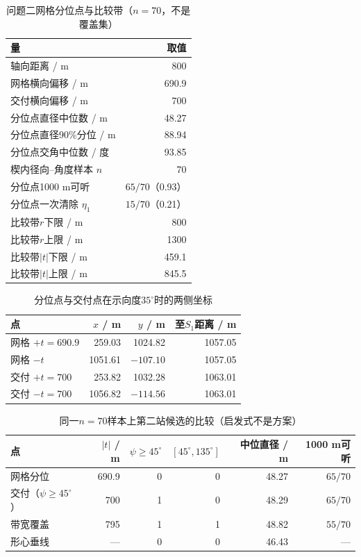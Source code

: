 \documentclass{cumcmthesis}
\begin{document}
\begin{table}[htbp]
\centering
\caption{问题二网格分位点与比较带（$n=70$，不是覆盖集）}
\label{tab:q2des}
\begin{tabular}{lr}
\toprule
量 & 取值 \\
\midrule
轴向距离 / m & 800 \\
网格横向偏移 / m & 690.9 \\
交付横向偏移 / m & 700 \\
分位点直径中位数 / m & 48.27 \\
分位点直径90\%分位 / m & 88.94 \\
分位点交角中位数 / 度 & 93.85 \\
楔内径向--角度样本 $n$ & 70 \\
分位点1000 m可听 & $65/70$（0.93） \\
分位点一次清除 $\eta_1$ & $15/70$（0.21） \\
比较带$r$下限 / m & 800 \\
比较带$r$上限 / m & 1300 \\
比较带$|t|$下限 / m & 459.1 \\
比较带$|t|$上限 / m & 845.5 \\
\bottomrule
\end{tabular}
\end{table}

\begin{table}[htbp]
\centering
\caption{分位点与交付点在示向度$35^\circ$时的两侧坐标}
\label{tab:q2xy}
\begin{tabular}{lrrr}
\toprule
点 & $x$ / m & $y$ / m & 至$S_1$距离 / m \\
\midrule
网格 $+t=690.9$ & 259.03 & 1024.82 & 1057.05 \\
网格 $-t$ & 1051.61 & $-107.10$ & 1057.05 \\
交付 $+t=700$ & 253.82 & 1032.28 & 1063.01 \\
交付 $-t=700$ & 1056.82 & $-114.56$ & 1063.01 \\
\bottomrule
\end{tabular}
\end{table}

\begin{table}[htbp]
\centering
\caption{同一$n=70$样本上第二站候选的比较（启发式不是方案）}
\label{tab:q2cmp}
\begin{tabular}{lrrrrr}
\toprule
点 & $|t|$ / m & $\psi\ge 45^\circ$ & $[45^\circ,135^\circ]$ & 中位直径 / m & 1000 m可听 \\
\midrule
网格分位 & 690.9 & 0 & 0 & 48.27 & $65/70$ \\
交付（$\psi\ge 45^\circ$） & 700 & 1 & 0 & 48.29 & $65/70$ \\
带宽覆盖 & 795 & 1 & 1 & 48.82 & $55/70$ \\
形心垂线 & --- & 0 & 0 & 46.43 & --- \\
\bottomrule
\end{tabular}
\end{table}
\end{document}
